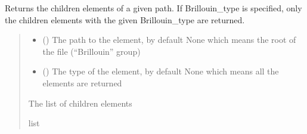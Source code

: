 \documentclass[letterpaper,10pt,english]{sphinxmanual}
\begin{document}
\begin{fulllineitems}
\begin{fulllineitems}
\label{\detokenize{_autosummary/HDF5_BLS.wrapper:HDF5_BLS.wrapper.Wrapper.get_children_elements}}
\pysigstartsignatures
\pysiglinewithargsret
{}
{\sphinxparamcomma {}}
{}
\pysigstopsignatures
\sphinxAtStartPar
Returns the children elements of a given path. If Brillouin\_type is specified, only the children elements with the given Brillouin\_type are returned.
\begin{quote}\begin{description}
\begin{itemize}
\item {} 
\sphinxAtStartPar
{} (\sphinxstyleliteralemphasis{\sphinxupquote{, }}) \textendash{} The path to the element, by default None which means the root of the file (“Brillouin” group)

\item {} 
\sphinxAtStartPar
{} (\sphinxstyleliteralemphasis{\sphinxupquote{, }}) \textendash{} The type of the element, by default None which means all the elements are returned

\end{itemize}

\sphinxAtStartPar
The list of children elements

\sphinxAtStartPar
list

\end{description}\end{quote}

\end{fulllineitems}



\end{fulllineitems}
\end{document}
